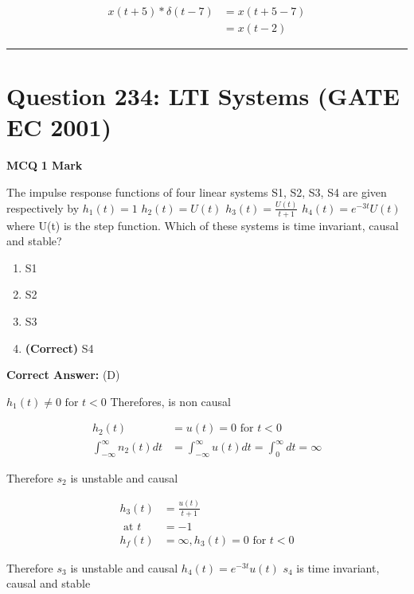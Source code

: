 \documentclass[11pt,a4paper]{article}
\begin{document}
\begin{tcolorbox}[solbox, title=Detailed Solution -- Question 233]
\[
\begin{aligned} x(t+5) * \delta(t-7) &=x(t+5-7) \\ &=x(t-2) \end{aligned}
\]
\end{tcolorbox}

\vspace{1.5em}
\hrule
\vspace{1.5em}

\section*{Question 234: LTI Systems (GATE EC 2001)}
\noindent \textbf{\color{primary}MCQ} \hfill \textbf{\color{secondary}1 Mark}


\noindent The impulse response functions of four linear systems S1, S2, S3, S4 are given
respectively by 
$h_{1}(t)=1$
$h_{2}(t)=U(t)$
 $h_{3}(t)=\frac{U(t)}{t+1}$
$h_{4}(t)=e^{-3t}U(t)$
where U(t) is the step function. Which of these systems is time invariant, causal and stable?


\begin{enumerate}[label=(\Alph*)]
    \item S1
    \item S2
    \item S3
    \item \textbf{(Correct)} S4
\end{enumerate}

\noindent \textbf{Correct Answer:} (D)

\begin{tcolorbox}[solbox, title=Detailed Solution -- Question 234]
$h_{1}(t) \neq 0 \text { for } t< 0$
 Therefores, is non causal 

\[
\begin{aligned} h_{2}(t)&=u(t)=0 \text { for } t < 0 \\ \int_{-\infty}^{\infty} n_{2}(t) d t&=\int_{-\infty}^{\infty} u(t) d t=\int_{0}^{\infty} d t=\infty \end{aligned}
\]

 Therefore $s_{2}$ is unstable and causal

\[
\begin{aligned} h_{3}(t)&=\frac{u(t)}{t+1} \\ \text { at } t&=-1 \\ h_{f}(t)&=\infty, h_{3}(t)=0 \text { for } t < 0 \end{aligned}
\]

 Therefore $s_{3}$ is unstable and causal
$h_{4}(t)=e^{-3 t} u(t)$
$s_{4}$ is time invariant, causal and stable
\end{tcolorbox}
\end{document}
